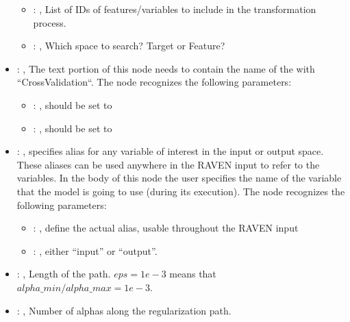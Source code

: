 \begin{itemize}
\begin{itemize}
        \item {}: , 
          List of IDs of features/variables to include in the transformation process.

        \item {}: , 
          Which space to search? Target or Feature?
      \end{itemize}

    \item {}: , 
      The text portion of this node needs to contain the name of the  with
               ``CrossValidation``.
      The  node recognizes the following parameters:
        \begin{itemize}
          \item {}: , 
            should be set to 
          \item {}: , 
            should be set to 
      \end{itemize}

    \item {}: , 
      specifies alias for         any variable of interest in the input or output space. These
      aliases can be used anywhere in the RAVEN input to         refer to the variables. In the body
      of this node the user specifies the name of the variable that the model is going to use
      (during its execution).
      The  node recognizes the following parameters:
        \begin{itemize}
          \item {}: , 
            define the actual alias, usable throughout the RAVEN input
          \item {}: , 
            either ``input'' or ``output''.
      \end{itemize}

    \item {}: , 
      Length of the path. $eps=1e-3$ means that $alpha\_min / alpha\_max = 1e-3$.

    \item {}: , 
      Number of alphas along the regularization path.


\end{itemize}
